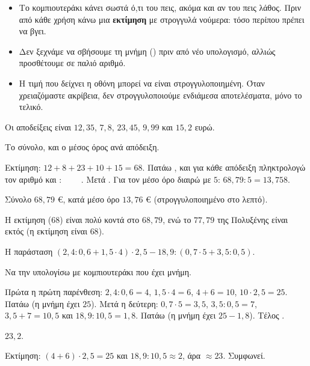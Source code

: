 \begin{prosoxi}
\begin{itemize}[leftmargin=1.2em,itemsep=0.3ex,topsep=2pt]
\item Το κομπιουτεράκι κάνει σωστά ό,τι του πεις, ακόμα και αν του πεις λάθος. Πριν από κάθε χρήση κάνω μια \textbf{εκτίμηση} με στρογγυλά νούμερα: τόσο περίπου πρέπει να βγει.
\item Δεν ξεχνάμε να σβήσουμε τη μνήμη () πριν από νέο υπολογισμό, αλλιώς προσθέτουμε σε παλιό αριθμό.
\item Η τιμή που δείχνει η οθόνη μπορεί να είναι στρογγυλοποιημένη. Όταν χρειαζόμαστε ακρίβεια, δεν στρογγυλοποιούμε ενδιάμεσα αποτελέσματα, μόνο το τελικό.
\end{itemize}
\end{prosoxi}


\tixero Οι αποδείξεις είναι $12{,}35$, $7{,}8$, $23{,}45$, $9{,}99$ και $15{,}2$ ευρώ.\par
\tithelo Το σύνολο, και ο μέσος όρος ανά απόδειξη.\par
\possindeo Εκτίμηση: $12+8+23+10+15=68$. Πατάω , και για κάθε απόδειξη πληκτρολογώ τον αριθμό και : \ \ \ \ . Μετά . Για τον μέσο όρο διαιρώ με $5$: $68{,}79:5=13{,}758$.\par
\apantisi Σύνολο $68{,}79$ €, κατά μέσο όρο $13{,}76$ € (στρογγυλοποιημένο στο λεπτό).\par
\elegxos Η εκτίμηση ($68$) είναι πολύ κοντά στο $68{,}79$, ενώ το $77{,}79$ της Πολυξένης είναι εκτός (η εκτίμηση είναι $68$).

\tixero Η παράσταση $(2{,}4:0{,}6+1{,}5\cdot4)\cdot2{,}5-18{,}9:(0{,}7\cdot5+3{,}5:0{,}5)$.\par
\tithelo Να την υπολογίσω με κομπιουτεράκι που έχει μνήμη.\par
\possindeo Πρώτα η πρώτη παρένθεση: $2{,}4:0{,}6=4$, $1{,}5\cdot4=6$, $4+6=10$, $10\cdot2{,}5=25$. Πατάω  (η μνήμη έχει $25$). Μετά η δεύτερη: $0{,}7\cdot5=3{,}5$, $3{,}5:0{,}5=7$, $3{,}5+7=10{,}5$ και $18{,}9:10{,}5=1{,}8$. Πατάω  (η μνήμη έχει $25-1{,}8$). Τέλος .\par
\apantisi $23{,}2$.\par
\elegxos Εκτίμηση: $(4+6)\cdot2{,}5=25$ και $18{,}9:10{,}5\approx2$, άρα $\approx23$. Συμφωνεί.

